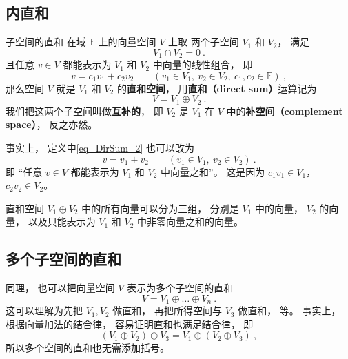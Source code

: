 
\begin{issues}
\issueTODO
{}
\end{issues}


\subsection{内直和}

\begin{definition}{子空间的直和}\label{def_DirSum_1}
在域 $\mathbb F$ 上的向量空间 $V$ 上取 两个子空间 $V_1$ 和 $V_2$， 满足
\begin{equation}
V_1 \cap V_2 = \qty{0}~.
\end{equation}
且任意 ${v} \in V$ 都能表示为 $V_1$ 和 $V_2$ 中向量的线性组合， 即
\begin{equation}\label{eq_DirSum_2}
{v} = c_1 {v_1} + c_2 {v_2}
\qquad
({v_1} \in V_1,\ {v_2} \in V_2,\ c_1, c_2 \in \mathbb F)~,
\end{equation}
那么空间 $V$ 就是 $V_1$ 和 $V_2$ 的\textbf{直和空间}， 用\textbf{直和（direct sum）}运算记为
\begin{equation}
V = V_1 \oplus V_2~.
\end{equation}
我们把这两个子空间叫做\textbf{互补的}， 即 $V_2$ 是 $V_1$ 在 $V$ 中的\textbf{补空间（complement space）}， 反之亦然。
\end{definition}

事实上， 定义中\autoref{eq_DirSum_2} 也可以改为
\begin{equation}
{v} = {v_1} + {v_2} \qquad
({v_1} \in V_1,\ {v_2} \in V_2)~.
\end{equation}
即 “任意 ${v} \in V$ 都能表示为 $V_1$ 和 $V_2$ 中向量之和”。 这是因为 $c_1 v_1 \in V_1$， $c_2 v_2 \in V_2$。

直和空间 $V_1 \oplus V_2$ 中的所有向量可以分为三组， 分别是 $V_1$ 中的向量， $V_2$ 的向量， 以及只能表示为 $V_1$ 和 $V_2$ 中非零向量之和的向量。

\subsection{多个子空间的直和}
同理， 也可以把向量空间 $V$ 表示为多个子空间的直和
\begin{equation}
V = V_1 \oplus \dots \oplus V_n~.
\end{equation}
这可以理解为先把 $V_1, V_2$ 做直和， 再把所得空间与 $V_3$ 做直和， 等。 事实上， 根据向量加法的结合律， 容易证明直和也满足结合律， 即
\begin{equation}
(V_1 \oplus V_2) \oplus V_3 = V_1 \oplus (V_2 \oplus V_3)~,
\end{equation}
所以多个空间的直和也无需添加括号。

